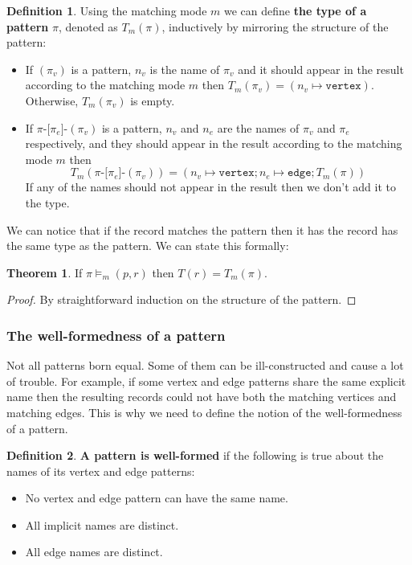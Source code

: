 \documentclass[14pt]{constructor-thesis}
\theoremstyle{definition}
\newtheorem*{theorem}{Theorem}
\newtheorem*{definition}{Definition}
\begin{document}
\begin{definition}
  Using the matching mode $m$ we can define \textbf{the type of a pattern} $\pi$, denoted as $T_m(\pi)$, inductively by mirroring the structure of the pattern:
  \begin{itemize}
    \item If $(\pi_v)$ is a pattern, $n_v$ is the name of $\pi_v$ and it should appear in the result according to the matching mode $m$ then $T_m(\pi_v) = (n_v \mapsto \texttt{vertex})$. Otherwise, $T_m(\pi_v)$ is empty.
    \item If $\pi \texttt{-[} \pi_e \texttt{]-} (\pi_v)$ is a pattern, $n_v$ and $n_e$ are the names of $\pi_v$ and $\pi_e$ respectively, and they should appear in the result according to the matching mode $m$ then
    $$T_m(\pi \texttt{-[} \pi_e \texttt{]-} (\pi_v)) = (n_v \mapsto \texttt{vertex}; n_e \mapsto \texttt{edge}; T_m(\pi))$$ 
    If any of the names should not appear in the result then we don't add it to the type.
  \end{itemize}
\end{definition}

We can notice that if the record matches the pattern then it has the record has the same type as the pattern. We can state this formally:
\begin{theorem}
  If $\pi \models_m (p, r)$ then $T(r) = T_m(\pi)$.
\end{theorem}
\begin{proof}
  By straightforward induction on the structure of the pattern.
\end{proof}

\subsubsection{The well-formedness of a pattern}

Not all patterns born equal. Some of them can be ill-constructed and cause a lot of trouble. For example, if some vertex and edge patterns share the same explicit name then the resulting records could not have both the matching vertices and matching edges. This is why we need to define the notion of the well-formedness of a pattern.

\begin{definition}
  \textbf{A pattern is well-formed} if the following is true about the names of its vertex and edge patterns:
  \begin{itemize}
    \item No vertex and edge pattern can have the same name.
    \item All implicit names are distinct.
    \item All edge names are distinct.
  \end{itemize}
\end{definition}
\end{document}

